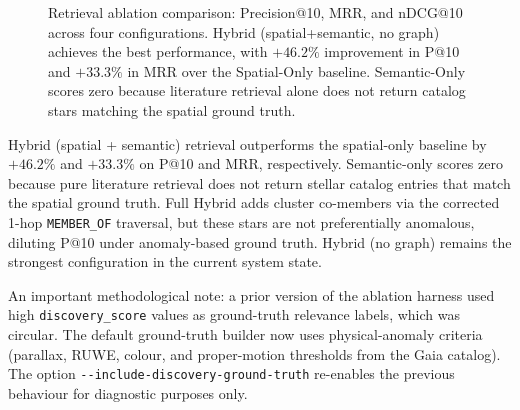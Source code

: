 \documentclass[preprint,12pt,authoryear]{elsarticle}
\begin{document}
\begin{figure}[htbp]
\centering
{}
\caption{\label{fig:ablation_bar}Retrieval ablation comparison: Precision@10, MRR, and nDCG@10 across four configurations. Hybrid (spatial+semantic, no graph) achieves the best performance, with $+46.2\%$ improvement in P@10 and $+33.3\%$ in MRR over the Spatial-Only baseline. Semantic-Only scores zero because literature retrieval alone does not return catalog stars matching the spatial ground truth.}
\end{figure}

\noindent
Hybrid (spatial + semantic) retrieval outperforms the spatial-only baseline by $+46.2\%$ and $+33.3\%$ on P@10 and MRR, respectively.
Semantic-only scores zero because pure literature retrieval does not return stellar catalog entries that match the spatial ground truth. Full Hybrid adds cluster co-members via the corrected 1-hop \texttt{MEMBER\allowbreak\_OF} traversal, but these stars are not preferentially anomalous, diluting P@10 under anomaly-based ground truth. Hybrid (no graph) remains the strongest configuration in the current system state.

An important methodological note: a prior version of the ablation harness used high \texttt{discovery\allowbreak\_score} values as ground-truth relevance labels, which was circular. The default ground-truth builder now uses physical-anomaly criteria (parallax, RUWE, colour, and proper-motion thresholds from the Gaia catalog). The option \texttt{-{}-include-\allowbreak discovery-\allowbreak ground-truth} re-enables the previous behaviour for diagnostic purposes only.
\end{document}

